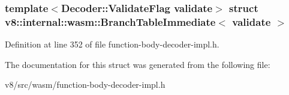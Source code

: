 \subsubsection*{template$<$Decoder\+::\+Validate\+Flag validate$>$\newline
struct v8\+::internal\+::wasm\+::\+Branch\+Table\+Immediate$<$ validate $>$}



Definition at line 352 of file function-\/body-\/decoder-\/impl.\+h.



The documentation for this struct was generated from the following file\+:\begin{DoxyCompactItemize}
\item 
v8/src/wasm/function-\/body-\/decoder-\/impl.\+h\end{DoxyCompactItemize}
